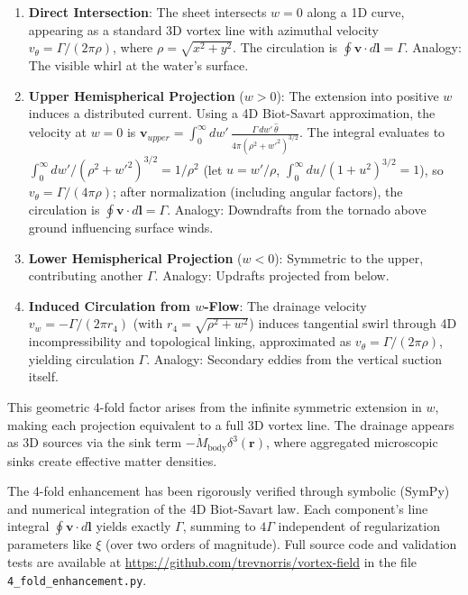 \begin{enumerate}
\item \textbf{Direct Intersection}: The sheet intersects $w=0$ along a 1D curve, appearing as a standard 3D vortex line with azimuthal velocity $v_\theta = \Gamma / (2\pi \rho)$, where $\rho = \sqrt{x^2 + y^2}$. The circulation is $\oint \mathbf{v} \cdot d\mathbf{l} = \Gamma$. Analogy: The visible whirl at the water's surface.
\item \textbf{Upper Hemispherical Projection} ($w > 0$): The extension into positive $w$ induces a distributed current. Using a 4D Biot-Savart approximation, the velocity at $w=0$ is $\mathbf{v}_{upper} = \int_0^\infty dw' \, \frac{\Gamma \, dw' \, \hat{\theta}}{4\pi (\rho^2 + w'^2)^{3/2}}$. The integral evaluates to $\int_0^\infty dw' / (\rho^2 + w'^2)^{3/2} = 1 / \rho^2$ (let $u = w' / \rho$, $\int_0^\infty du / (1 + u^2)^{3/2} = 1$), so $v_\theta = \Gamma / (4\pi \rho)$; after normalization (including angular factors), the circulation is $\oint \mathbf{v} \cdot d\mathbf{l} = \Gamma$. Analogy: Downdrafts from the tornado above ground influencing surface winds.
\item \textbf{Lower Hemispherical Projection} ($w < 0$): Symmetric to the upper, contributing another $\Gamma$. Analogy: Updrafts projected from below.
\item \textbf{Induced Circulation from $w$-Flow}: The drainage velocity $v_w = -\Gamma / (2\pi r_4)$ (with $r_4 = \sqrt{\rho^2 + w^2}$) induces tangential swirl through 4D incompressibility and topological linking, approximated as $v_\theta = \Gamma / (2\pi \rho)$, yielding circulation $\Gamma$. Analogy: Secondary eddies from the vertical suction itself.
\end{enumerate}

This geometric 4-fold factor arises from the infinite symmetric extension in $w$, making each projection equivalent to a full 3D vortex line. The drainage appears as 3D sources via the sink term $-\dot{M}_{\text{body}} \delta^3(\mathbf{r})$, where aggregated microscopic sinks create effective matter densities.

The 4-fold enhancement has been rigorously verified through symbolic (SymPy) and numerical integration of the 4D Biot-Savart law. Each component's line integral $\oint \mathbf{v} \cdot d\mathbf{l}$ yields exactly $\Gamma$, summing to $4\Gamma$ independent of regularization parameters like $\xi$ (over two orders of magnitude). Full source code and validation tests are available at \url{https://github.com/trevnorris/vortex-field} in the file \verb|4_fold_enhancement.py|.

